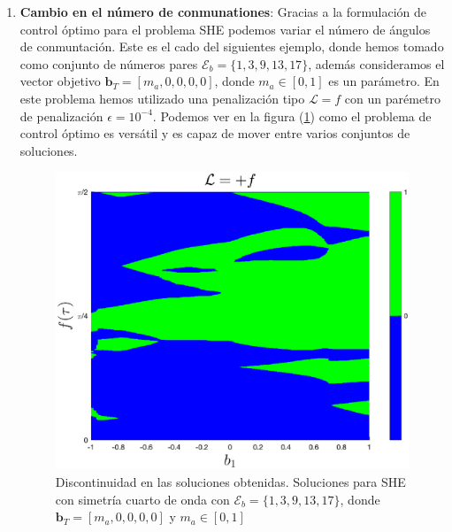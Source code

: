 \begin{enumerate}
    \item \textbf{Cambio en el número de conmunationes}: Gracias a la formulación de control óptimo para el problema SHE podemos variar el número de ángulos de conmuntación. 
    Este es el cado del siguientes ejemplo, donde hemos tomado como conjunto de números pares $\mathcal{E}_b = \{1,3,9,13,17\}$,   además consideramos el vector objetivo $\bm{b}_T = [m_a,0,0,0,0]$, donde  $m_a \in [0,1]$ es un parámetro. 
    En este problema hemos utilizado una penalización tipo $\mathcal{L} = f$ con un parémetro de penalización $\epsilon=10^{-4}$.
    Podemos ver en la figura (\ref{disco}) como el problema de control óptimo es versátil y es capaz de mover entre varios conjuntos de soluciones.



    \begin{figure}[!ht]
        \centering
        \includegraphics[scale=0.45]{img/EX00_surf_2LVL.eps}
        \caption{Discontinuidad en las soluciones obtenidas. Soluciones para SHE con simetría cuarto de onda con $\mathcal{E}_b = \{1,3,9,13,17\}$, donde $\bm{b}_T = [m_a,0,0,0,0]$ y  $m_a \in [0,1]$}
        \label{disco}
    \end{figure}



\end{enumerate}
